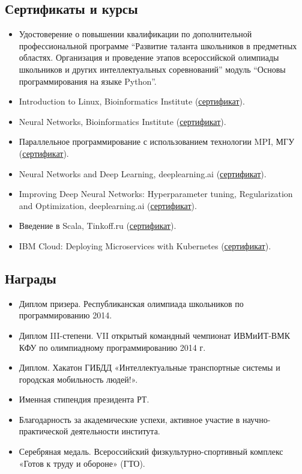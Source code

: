 \documentclass[11pt]{article}
\begin{document}
\subsection{Сертификаты и курсы}
\label{sec:orgec4dcc8}
\begin{itemize}
\item Удостоверение о повышении квалификации по дополнительной профессиональной
программе ``Развитие таланта школьников в предметных областях. Организация и
проведение этапов всероссийской олимпиады школьников и других интеллектуальных
соревнований'' модуль ``Основы программирования на языке Python''.
\item Introduction to Linux, Bioinformatics Institute (\href{https://stepik.org/certificate/a5be96ccb072ab5111d87827a136717d8cd3b07c.pdf}{сертификат}).
\item Neural Networks, Bioinformatics Institute (\href{https://stepik.org/certificate/e76394b2a12210c8785eaee1ba321507cc38b12c.pdf}{сертификат}).
\item Параллельное программирование с использованием технологии MPI, МГУ
(\href{https://www.intuit.ru/verifydiplomas/101054900}{сертификат}).
\item Neural Networks and Deep Learning, deeplearning.ai (\href{https://www.coursera.org/account/accomplishments/certificate/RNA9D7YTE9LY}{сертификат}).
\item Improving Deep Neural Networks: Hyperparameter tuning, Regularization and
Optimization, deeplearning.ai (\href{https://www.coursera.org/account/accomplishments/certificate/8B6U4TYN9K83}{сертификат}).
\item Введение в Scala, Tinkoff.ru (\href{https://stepik.org/certificate/be03c58fee7c7a50a60b3a6d9113fa2b8c95fbfc.pdf}{сертификат}).
\item IBM Cloud: Deploying Microservices with Kubernetes (\href{https://www.coursera.org/account/accomplishments/certificate/8YD5PVQFBHKE}{сертификат}).
\end{itemize}
\subsection{Награды}
\label{sec:org8bbed9d}
\begin{itemize}
\item Диплом призера. Республиканская олимпиада школьников по программированию 2014.
\item Диплом III-степени. VII открытый командный чемпионат ИВМиИТ-ВМК КФУ по
олимпиадному программированию 2014 г.
\item Диплом. Хакатон ГИБДД «Интеллектуальные транспортные системы и городская
мобильность людей!».
\item Именная стипендия президента РТ.
\item Благодарность за академические успехи, активное участие в научно-практической
деятельности института.
\item Серебряная медаль. Всероссийский физкультурно-спортивный комплекс «Готов к
труду и обороне» (ГТО).
\end{itemize}
\end{document}
